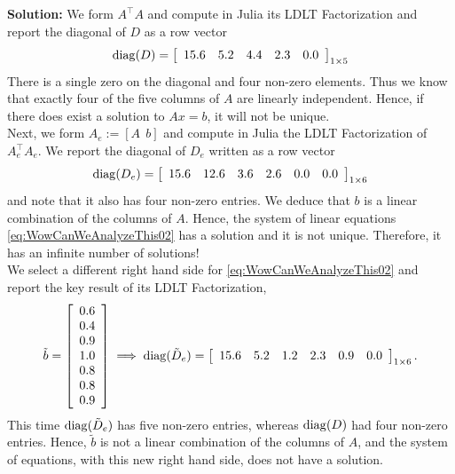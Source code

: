 \textbf{Solution:} We form $A^\top A$ and compute in Julia its LDLT Factorization  and report the diagonal of $D$ as a row vector
\begin{equation}
{\rm diag}(D) = \left[
\begin{array}{ccccc}
15.6 & 5.2 & 4.4 & 2.3 & 0.0\\
\end{array}
\right]_{1 \times 5}
\end{equation}
There is a single zero on the diagonal and four non-zero elements. Thus we know that exactly four of the five columns of $A$ are linearly independent. Hence, if there does exist a solution to $Ax=b$, it will not be unique.\\

Next, we form $A_e :=[A~~b]$ and compute in Julia the LDLT Factorization of $A_e^\top A_e$. We report the diagonal of $D_e$ written as a row vector
\begin{equation}
{\rm diag}(D_e)=\left[
\begin{array}{cccccc}
15.6 & 12.6 & 3.6 & 2.6 & 0.0 & 0.0 
\end{array}
\right]_{1 \times 6}
\end{equation}
and note that it also has four non-zero entries. We deduce that $b$ is a linear combination of the columns of $A$. Hence, the system of linear equations \eqref{eq:WowCanWeAnalyzeThis02} has a solution and it is not unique. Therefore, it has an infinite number of solutions!\\

We select a different right hand side for \eqref{eq:WowCanWeAnalyzeThis02} and report the key result of its LDLT Factorization,
\begin{equation}
\tilde{b} = \left[
\begin{array}{r}
0.6 \\
0.4 \\
0.9 \\
1.0 \\
0.8 \\
0.8 \\
0.9
\end{array}
\right] \implies{\rm diag}(\tilde{D}_e) =\left[
\begin{array}{cccccc}
15.6 & 5.2 & 1.2 & 2.3 & 0.9 & 0.0  \\
\end{array}
\right]_{1 \times 6}.
\end{equation}
This time ${\rm diag}(\tilde{D}_e)$ has five non-zero entries, whereas ${\rm diag}(D)$ had four non-zero entries.  Hence, $\tilde{b}$ is not a linear combination of the columns of $A$, and the system of equations, with this new right hand side, does not have a solution.
\Qed


